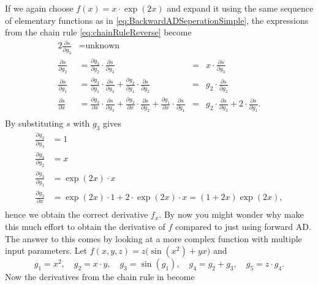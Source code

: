 If we again choose  $f(x) = x\cdot\exp(2x)$ and expand it using the same sequence of elementary functions as in \eqref{eq:BackwardADSeperationSimple}, the expressions from the chain rule \eqref{eq:chainRuleReverse} become
\begin{alignat*}{2}
    \frac{\partial s}{\partial g_3} &= \text{unknown}\\
    \frac{\partial s}{\partial g_2} &= \frac{\partial g_3}{\partial g_2} \cdot \frac{\partial s}{\partial g_3} &=& x\cdot \frac{\partial s}{\partial g_3} \\
    \frac{\partial s}{\partial g_1} &= \frac{\partial g_3}{\partial g_1}\cdot \frac{\partial s}{\partial g_3} + \frac{\partial g_2}{\partial g_1}\cdot \frac{\partial s}{\partial g_2} &=& g_2 \cdot \frac{\partial s}{\partial g_2} \\
    \frac{\partial s}{\partial x} &= \frac{\partial g_3}{\partial x}\cdot \frac{\partial s}{\partial g_3} + \frac{\partial g_2}{\partial x}\cdot \frac{\partial s}{\partial g_2} + \frac{\partial g_1}{\partial x}\cdot \frac{\partial s}{\partial g_1} &=& g_2\cdot \frac{\partial s}{\partial g_3} + 2\cdot \frac{\partial s}{\partial g_1}.\\
\end{alignat*}
By substituting $s$ with $g_3$ gives
\begin{align*}
    \frac{\partial g_3}{\partial g_3} &= 1\\
    \frac{\partial g_3}{\partial g_2} &= x\\
    \frac{\partial g_3}{\partial g_1} &= \exp(2x)\cdot x\\
    \frac{\partial g_3}{\partial x} &= \exp(2x)\cdot 1 + 2\cdot\exp(2x)\cdot x = (1 + 2x)\exp(2x),\\
\end{align*}
hence we obtain the correct derivative $f_x$. By now you might wonder why make this much effort to obtain the derivative of $f$ compared to just using forward AD. The answer to this comes by looking at a more complex function with multiple input parameters. Let $f(x,y,z) = z\bigl(\sin(x^2)+yx\bigr)$ and 
\begin{equation}
    g_1 = x^2, \quad g_2 = x\cdot y, \quad g_3 = \sin(g_1), \quad g_4 = g_2 + g_3, \quad g_5 = z\cdot g_4.
    \label{eq:DependencyBackwardAD}
\end{equation}
Now the derivatives from the chain rule in  become%
